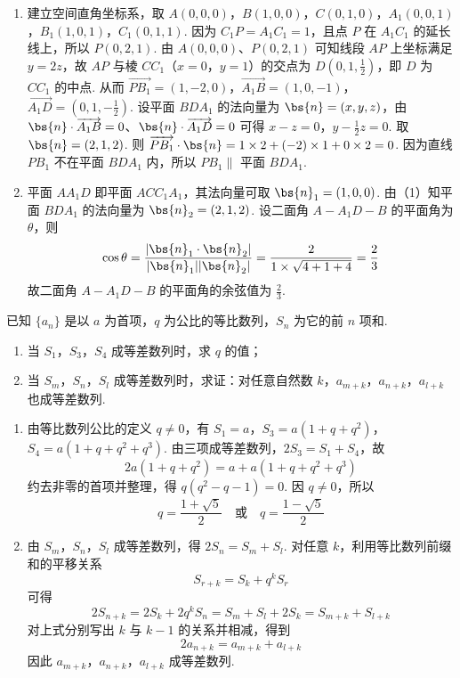 \begin{solution}
\begin{enumerate}
\item 建立空间直角坐标系，取
\(A(0,0,0)\)，\(B(1,0,0)\)，\(C(0,1,0)\)，\(A_1(0,0,1)\)，\(B_1(1,0,1)\)，\(C_1(0,1,1)\).
因为 \(C_1P=A_1C_1=1\)，且点 \(P\) 在 \(A_1C_1\) 的延长线上，所以 \(P(0,2,1)\).
由 \(A(0,0,0)\)、\(P(0,2,1)\) 可知线段 \(AP\) 上坐标满足 \(y=2z\)，故 \(AP\) 与棱 \(CC_1\)（\(x=0\)，\(y=1\)）的交点为 \(D\left(0,1,\frac12\right)\)，即 \(D\) 为 \(CC_1\) 的中点.
从而 \(\overrightarrow{PB_1}=(1,-2,0)\)，\(\overrightarrow{A_1B}=(1,0,-1)\)，\(\overrightarrow{A_1D}=\left(0,1,-\frac12\right)\).
设平面 \(BDA_1\) 的法向量为 \(\bs{n}=(x,y,z)\)，由 \(\bs{n}\cdot\overrightarrow{A_1B}=0\)、\(\bs{n}\cdot\overrightarrow{A_1D}=0\) 可得 \(x-z=0\)，\(y-\frac12z=0\). 取 \(\bs{n}=(2,1,2)\).
则 \(\overrightarrow{PB_1}\cdot\bs{n}=1\times2+(-2)\times1+0\times2=0\).
因为直线 \(PB_1\) 不在平面 \(BDA_1\) 内，所以 \(PB_1\parallel\) 平面 \(BDA_1\).

\item 平面 \(AA_1D\) 即平面 \(ACC_1A_1\)，其法向量可取 \(\bs{n}_1=(1,0,0)\).
由（1）知平面 \(BDA_1\) 的法向量为 \(\bs{n}_2=(2,1,2)\).
设二面角 \(A - A_1D - B\) 的平面角为 \(\theta\)，则
\[
\cos\theta=\frac{|\bs{n}_1\cdot\bs{n}_2|}{|\bs{n}_1||\bs{n}_2|}=\frac{2}{1\times\sqrt{4+1+4}}=\frac23
\]
故二面角 \(A - A_1D - B\) 的平面角的余弦值为 \(\frac23\).
\end{enumerate}
\end{solution}

\begin{problem}
已知 \(\{a_n\}\) 是以 \(a\) 为首项，\(q\) 为公比的等比数列，\(S_n\) 为它的前 \(n\) 项和.
\begin{enumerate}
\item 当 \(S_1\)，\(S_3\)，\(S_4\) 成等差数列时，求 \(q\) 的值；
\item 当 \(S_m\)，\(S_n\)，\(S_l\) 成等差数列时，求证：对任意自然数 \(k\)，\(a_{m+k}\)，\(a_{n+k}\)，\(a_{l+k}\) 也成等差数列.
\end{enumerate}
\end{problem}

\begin{solution}
\begin{enumerate}
\item 由等比数列公比的定义 \(q\ne0\)，有
\(S_1=a\)，\(S_3=a(1+q+q^2)\)，\(S_4=a(1+q+q^2+q^3)\).
由三项成等差数列，\(2S_3=S_1+S_4\)，故
\[
2a(1+q+q^2)=a+a(1+q+q^2+q^3)
\]
约去非零的首项并整理，得 \(q(q^2-q-1)=0\). 因 \(q\ne0\)，所以
\[
q=\frac{1+\sqrt5}{2}\quad\text{或}\quad q=\frac{1-\sqrt5}{2}
\]
\item 由 \(S_m\)，\(S_n\)，\(S_l\) 成等差数列，得 \(2S_n=S_m+S_l\). 对任意 \(k\)，利用等比数列前缀和的平移关系
\[
S_{r+k}=S_k+q^kS_r
\]
可得
\[
2S_{n+k}=2S_k+2q^kS_n=S_m+S_l+2S_k=S_{m+k}+S_{l+k}
\]
对上式分别写出 \(k\) 与 \(k-1\) 的关系并相减，得到
\[
2a_{n+k}=a_{m+k}+a_{l+k}
\]
因此 \(a_{m+k}\)，\(a_{n+k}\)，\(a_{l+k}\) 成等差数列.
\end{enumerate}
\end{solution}

